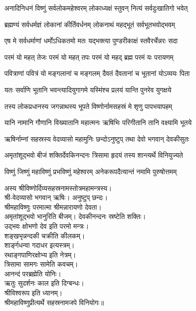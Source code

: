 \twolineshloka
{अनादिनिधनं विष्णुं सर्वलोकमहेश्वरम्}
{लोकाध्यक्षं स्तुवन् नित्यं सर्वदुःखातिगो भवेत्}

\twolineshloka
{ब्रह्मण्यं सर्वधर्मज्ञं लोकानां कीर्तिवर्धनम्}
{लोकनाथं महद्भूतं सर्वभूतभवोद्भवम्}

\twolineshloka
{एष मे सर्वधर्माणां धर्मोऽधिकतमो मतः}
{यद्भक्त्या पुण्डरीकाक्षं स्तवैरर्चेन्नरः सदा}

\twolineshloka
{परमं यो महत् तेजः परमं यो महत् तपः}
{परमं यो महद् ब्रह्म परमं यः परायणम्}

\twolineshloka
{पवित्राणां पवित्रं यो मङ्गलानां च मङ्गलम्}
{दैवतं दैवतानां च भूतानां योऽव्ययः पिता}

\twolineshloka
{यतः सर्वाणि भूतानि भवन्त्यादियुगागमे}
{यस्मिंश्च प्रलयं यान्ति पुनरेव युगक्षये}

\twolineshloka
{तस्य लोकप्रधानस्य जगन्नाथस्य भूपते}
{विष्णोर्नामसहस्रं मे शृणु पापभयापहम्}

\twolineshloka
{यानि नामानि गौणानि विख्यातानि महात्मनः}
{ऋषिभिः परिगीतानि तानि वक्ष्यामि भूतये}

\twolineshloka
{ऋषिर्नाम्नां सहस्रस्य वेदव्यासो महामुनिः}
{छन्दोऽनुष्टुप् तथा देवो भगवान् देवकीसुतः}

\twolineshloka
{अमृतांशूद्भवो बीजं शक्तिर्देवकिनन्दनः}
{त्रिसामा हृदयं तस्य शान्त्यर्थे विनियुज्यते}

\twolineshloka
{विष्णुं जिष्णुं महाविष्णुं प्रभविष्णुं महेश्वरम्}
{अनेकरूपदैत्यान्तं नमामि पुरुषोत्तमम्}

अस्य श्रीविष्णोर्दिव्यसहस्रनामस्तोत्रमहामन्त्रस्य।\\
श्री-वेदव्यासो भगवान् ऋषिः। अनुष्टुप् छन्दः।\\
श्रीमहाविष्णुः परमात्मा श्रीमन्नारायणो देवता।\\
अमृतांशूद्भवो भानुरिति बीजम्। देवकीनन्दनः स्रष्टेति शक्तिः।\\
उद्भवः क्षोभणो देव इति परमो मन्त्रः।\\
शङ्खभृन्नन्दकी चक्रीति कीलकम्।\\
शार्ङ्गधन्वा गदाधर इत्यस्त्रम्। \\
रथाङ्गपाणिरक्षोभ्य इति नेत्रम्। \\
त्रिसामा सामगः सामेति कवचम्।\\
आनन्दं परब्रह्मेति योनिः।\\
ऋतुः सुदर्शनः काल इति दिग्बन्धः। \\
श्रीविश्वरूप इति ध्यानम्।\\
श्रीमहाविष्णुप्रीत्यर्थे सहस्रनामजपे विनियोगः॥\\

